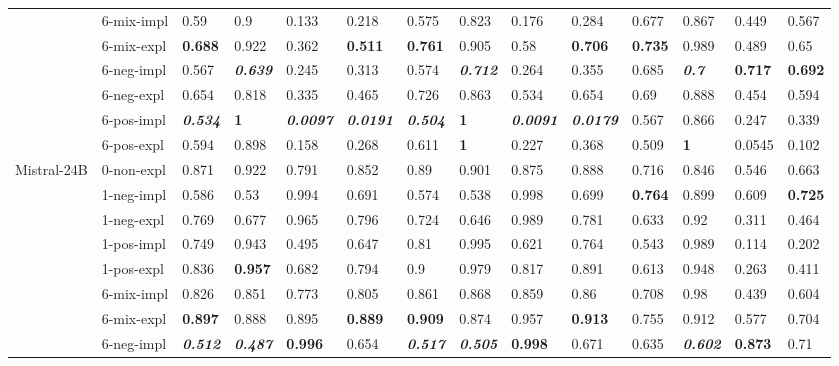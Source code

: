 \begin{tabular}{ll|llll|llll|llll}
 & 6-mix-impl & 0.59 & 0.9 & 0.133 & 0.218 & 0.575 & 0.823 & 0.176 & 0.284 & 0.677 & 0.867 & 0.449 & 0.567 \\
 & 6-mix-expl & \bfseries 0.688 & 0.922 & 0.362 & \bfseries 0.511 & \bfseries 0.761 & 0.905 & 0.58 & \bfseries 0.706 & \bfseries 0.735 & 0.989 & 0.489 & 0.65 \\
 & 6-neg-impl & 0.567 & \bfseries \itshape 0.639 & 0.245 & 0.313 & 0.574 & \bfseries \itshape 0.712 & 0.264 & 0.355 & 0.685 & \bfseries \itshape 0.7 & \bfseries 0.717 & \bfseries 0.692 \\
 & 6-neg-expl & 0.654 & 0.818 & 0.335 & 0.465 & 0.726 & 0.863 & 0.534 & 0.654 & 0.69 & 0.888 & 0.454 & 0.594 \\
 & 6-pos-impl & \bfseries \itshape 0.534 & \bfseries 1 & \bfseries \itshape 0.0097 & \bfseries \itshape 0.0191 & \bfseries \itshape 0.504 & \bfseries 1 & \bfseries \itshape 0.0091 & \bfseries \itshape 0.0179 & 0.567 & 0.866 & 0.247 & 0.339 \\
 & 6-pos-expl & 0.594 & 0.898 & 0.158 & 0.268 & 0.611 & \bfseries 1 & 0.227 & 0.368 & 0.509 & \bfseries 1 & 0.0545 & 0.102 \\
\midrule
\multirow[t]{11}{*}{Mistral-24B} & 0-non-expl & 0.871 & 0.922 & 0.791 & 0.852 & 0.89 & 0.901 & 0.875 & 0.888 & 0.716 & 0.846 & 0.546 & 0.663 \\
 & 1-neg-impl & 0.586 & 0.53 & 0.994 & 0.691 & 0.574 & 0.538 & 0.998 & 0.699 & \bfseries 0.764 & 0.899 & 0.609 & \bfseries 0.725 \\
 & 1-neg-expl & 0.769 & 0.677 & 0.965 & 0.796 & 0.724 & 0.646 & 0.989 & 0.781 & 0.633 & 0.92 & 0.311 & 0.464 \\
 & 1-pos-impl & 0.749 & 0.943 & 0.495 & 0.647 & 0.81 & 0.995 & 0.621 & 0.764 & 0.543 & 0.989 & 0.114 & 0.202 \\
 & 1-pos-expl & 0.836 & \bfseries 0.957 & 0.682 & 0.794 & 0.9 & 0.979 & 0.817 & 0.891 & 0.613 & 0.948 & 0.263 & 0.411 \\
 & 6-mix-impl & 0.826 & 0.851 & 0.773 & 0.805 & 0.861 & 0.868 & 0.859 & 0.86 & 0.708 & 0.98 & 0.439 & 0.604 \\
 & 6-mix-expl & \bfseries 0.897 & 0.888 & 0.895 & \bfseries 0.889 & \bfseries 0.909 & 0.874 & 0.957 & \bfseries 0.913 & 0.755 & 0.912 & 0.577 & 0.704 \\
 & 6-neg-impl & \bfseries \itshape 0.512 & \bfseries \itshape 0.487 & \bfseries 0.996 & 0.654 & \bfseries \itshape 0.517 & \bfseries \itshape 0.505 & \bfseries 0.998 & 0.671 & 0.635 & \bfseries \itshape 0.602 & \bfseries 0.873 & 0.71 \\

\end{tabular}

